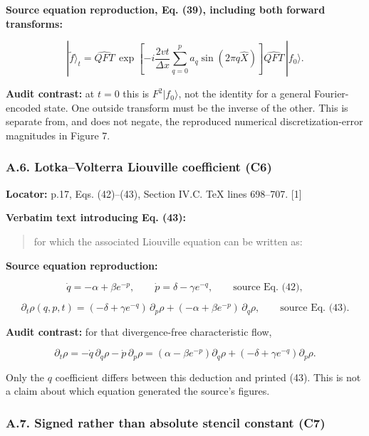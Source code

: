 \textbf{Source equation reproduction, Eq. (39), including both forward
transforms:}

\[
|\widetilde f\rangle_t
=\widehat{QFT}\,
\exp\!\left[-i\frac{2vt}{\Delta x}
\sum_{q=0}^{p}a_q\sin(2\pi q\hat X)\right]
\widehat{QFT}\,|f_0\rangle.
\]

\textbf{Audit contrast:} at \(t=0\) this is \(F^2|f_0\rangle\), not the
identity for a general Fourier-encoded state. One outside transform must
be the inverse of the other. This is separate from, and does not negate,
the reproduced numerical discretization-error magnitudes in Figure 7.

\subsubsection{A.6. Lotka--Volterra Liouville coefficient
(C6)}\label{a.6.-lotkavolterra-liouville-coefficient-c6}

\textbf{Locator:} p.17, Eqs. (42)--(43), Section IV.C. TeX lines
698--707. {[}1{]}

\textbf{Verbatim text introducing Eq. (43):}

\begin{quote}
for which the associated Liouville equation can be written as:
\end{quote}

\textbf{Source equation reproduction:}

\[
\dot q=-\alpha+\beta e^{-p},\qquad
\dot p=\delta-\gamma e^{-q},
\qquad\text{source Eq. (42)},
\]

\[
\partial_t\rho(q,p,t)
=(-\delta+\gamma e^{-q})\,\partial_p\rho
+(-\alpha+\beta e^{-p})\,\partial_q\rho,
\qquad\text{source Eq. (43)}.
\]

\textbf{Audit contrast:} for that divergence-free characteristic flow,

\[
\partial_t\rho=-\dot q\,\partial_q\rho-\dot p\,\partial_p\rho
=(\alpha-\beta e^{-p})\partial_q\rho
+(-\delta+\gamma e^{-q})\partial_p\rho.
\]

Only the \(q\) coefficient differs between this deduction and printed
(43). This is not a claim about which equation generated the source's
figures.

\subsubsection{A.7. Signed rather than absolute stencil constant
(C7)}\label{a.7.-signed-rather-than-absolute-stencil-constant-c7}

